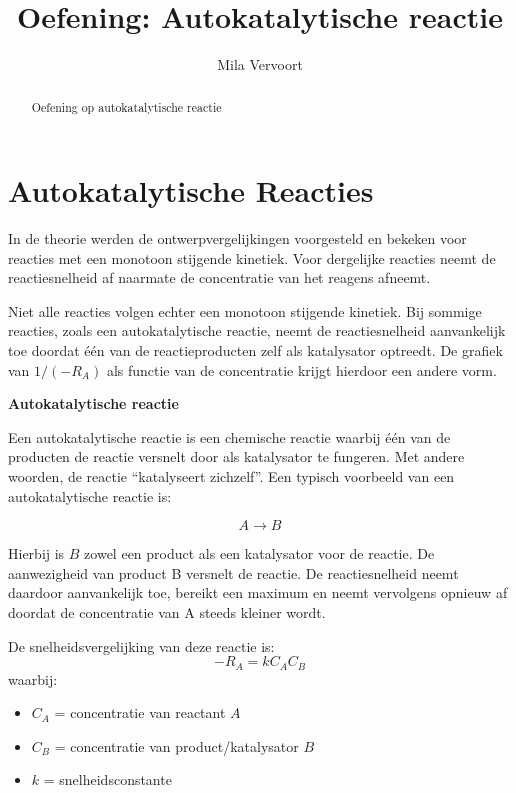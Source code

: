 \documentclass{ximera}
\title{Oefening: Autokatalytische reactie}
\author{Mila Vervoort}
\begin{document}
\begin{abstract}
    Oefening op autokatalytische reactie
\end{abstract}
\maketitle

\section*{Autokatalytische Reacties}

In de theorie werden de ontwerpvergelijkingen voorgesteld en bekeken voor reacties met een monotoon stijgende kinetiek. Voor dergelijke reacties neemt de reactiesnelheid af naarmate de concentratie van het reagens afneemt. 

Niet alle reacties volgen echter een monotoon stijgende kinetiek. Bij sommige reacties, zoals een autokatalytische reactie, neemt de reactiesnelheid aanvankelijk toe doordat één van de reactieproducten zelf als katalysator optreedt. De grafiek van $1/(-R_A)$ als functie van de concentratie krijgt hierdoor een andere vorm.

\begin{definition} \textbf{Autokatalytische reactie}
    
Een autokatalytische reactie is een chemische reactie waarbij één van de producten de reactie versnelt door als katalysator te fungeren. Met andere woorden, de reactie “katalyseert zichzelf”.  
Een typisch voorbeeld van een autokatalytische reactie is:

\[A \rightarrow B\]

Hierbij is \(B\) zowel een product als een katalysator voor de reactie. De aanwezigheid van product B versnelt de reactie. De reactiesnelheid neemt daardoor aanvankelijk toe, bereikt een maximum en neemt vervolgens opnieuw af doordat de concentratie van A steeds kleiner wordt.

De snelheidsvergelijking van deze reactie is:
\[
-R_A = k C_A C_B
\]
waarbij:
\begin{itemize}
    \item \(C_A\) = concentratie van reactant \(A\)  
    \item \(C_B\) = concentratie van product/katalysator \(B\)  
    \item \(k\) = snelheidsconstante
\end{itemize}
\end{definition}
\textbf{ }\\
\end{document}
